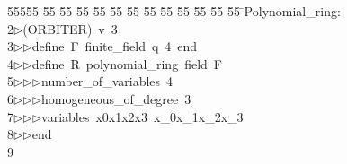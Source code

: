 %
%
\begin{tabbing}
55555 \= 55 \= 55 \= 55 \= 55 \= 55 \= 55 \= 55 \= 55 \= 55 \= 55 \= 55 \= 55 \= \>Polynomial\_ring:\\[0pt]
2\>$\triangleright$\>(ORBITER)\ v\ 3\ \\[0pt]
3\>$\triangleright$\>$\triangleright$\>define\ F\ finite\_field\ q\ 4\ end\ \\[0pt]
4\>$\triangleright$\>$\triangleright$\>define\ R\ polynomial\_ring\ field\ F\ \\[0pt]
5\>$\triangleright$\>$\triangleright$\>$\triangleright$\>number\_of\_variables\ 4\ \\[0pt]
6\>$\triangleright$\>$\triangleright$\>$\triangleright$\>homogeneous\_of\_degree\ 3\ \\[0pt]
7\>$\triangleright$\>$\triangleright$\>$\triangleright$\>variables\ x0x1x2x3\ x\_0x\_1x\_2x\_3\ \\[0pt]
8\>$\triangleright$\>$\triangleright$\>end\\[0pt]
9\>\end{tabbing}
